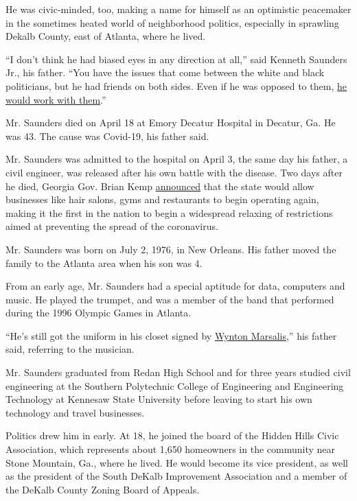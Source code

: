 He was civic-minded, too, making a name for himself as an optimistic
peacemaker in the sometimes heated world of neighborhood politics,
especially in sprawling Dekalb County, east of Atlanta, where he lived.

``I don't think he had biased eyes in any direction at all,'' said
Kenneth Saunders Jr., his father. ``You have the issues that come
between the white and black politicians, but he had friends on both
sides. Even if he was opposed to them,
\href{https://decaturish.com/2020/04/zba-and-south-dekalb-improvement-association-member-kenneth-saunders-iii-dies-from-covid-19/}{he
would work with them}.''

Mr. Saunders died on April 18 at Emory Decatur Hospital in Decatur, Ga.
He was 43. The cause was Covid-19, his father said.

Mr. Saunders was admitted to the hospital on April 3, the same day his
father, a civil engineer, was released after his own battle with the
disease. Two days after he died, Georgia Gov. Brian Kemp
\href{https://www.nytimes3xbfgragh.onion/2020/04/21/us/coronavirus-georgia-south-carolina.html}{announced}
that the state would allow businesses like hair salons, gyms and
restaurants to begin operating again, making it the first in the nation
to begin a widespread relaxing of restrictions aimed at preventing the
spread of the coronavirus.

Mr. Saunders was born on July 2, 1976, in New Orleans. His father moved
the family to the Atlanta area when his son was 4.

From an early age, Mr. Saunders had a special aptitude for data,
computers and music. He played the trumpet, and was a member of the band
that performed during the 1996 Olympic Games in Atlanta.

``He's still got the uniform in his closet signed by
\href{https://wyntonmarsalis.org/about/bio}{Wynton Marsalis},'' his
father said, referring to the musician.

Mr. Saunders graduated from Redan High School and for three years
studied civil engineering at the Southern Polytechnic College of
Engineering and Engineering Technology at Kennesaw State University
before leaving to start his own technology and travel businesses.

Politics drew him in early. At 18, he joined the board of the Hidden
Hills Civic Association, which represents about 1,650 homeowners in the
community near Stone Mountain, Ga., where he lived. He would become its
vice president, as well as the president of the South DeKalb Improvement
Association and a member of the DeKalb County Zoning Board of Appeals.

